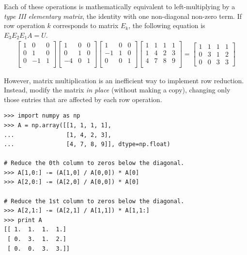 Each of these operations is mathematically equivalent to left-multiplying by a \emph{type III elementary matrix}, the identity with one non-diagonal non-zero term.
If row operation $k$ corresponds to matrix $E_k$, the following equation is $E_3E_2E_1A = U$.
%
\begin{align*}
\left[\begin{array}{ccc}
1 & 0 & 0 \\
0 & 1 & 0 \\
0 & -1 & 1 \\
\end{array}\right]
\left[\begin{array}{ccc}
1 & 0 & 0 \\
0 & 1 & 0 \\
-4 & 0 & 1 \\
\end{array}\right]
\left[\begin{array}{ccc}
1 & 0 & 0 \\
-1 & 1 & 0 \\
0 & 0 & 1 \\
\end{array}\right]
\left[\begin{array}{ccc|c}
1 & 1 & 1 & 1 \\
1 & 4 & 2 & 3 \\
4 & 7 & 8 & 9 \\
\end{array}\right]
=
\left[\begin{array}{ccc|c}
1 & 1 & 1 & 1 \\
0 & 3 & 1 & 2 \\
0 & 0 & 3 & 3
\end{array}\right]
\end{align*}

However, matrix multiplication is an inefficient way to implement row reduction.
Instead, modify the matrix \emph{in place} (without making a copy), changing only those entries that are affected by each row operation.

\begin{lstlisting}
>>> import numpy as np
>>> A = np.array([[1, 1, 1, 1],
...               [1, 4, 2, 3],
...               [4, 7, 8, 9]], dtype=np.float)

# Reduce the 0th column to zeros below the diagonal.
>>> A[1,0:] -= (A[1,0] / A[0,0]) * A[0]
>>> A[2,0:] -= (A[2,0] / A[0,0]) * A[0]

# Reduce the 1st column to zeros below the diagonal.
>>> A[2,1:] -= (A[2,1] / A[1,1]) * A[1,1:]
>>> print A
[[ 1.  1.  1.  1.]
 [ 0.  3.  1.  2.]
 [ 0.  0.  3.  3.]]
\end{lstlisting}

